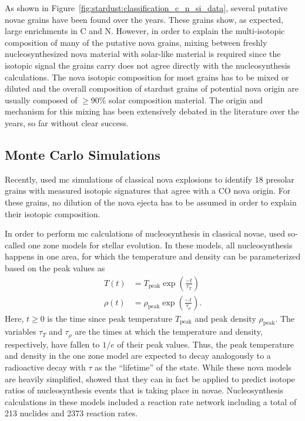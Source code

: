 As shown in Figure~\ref{fig:stardust:classification_c_n_si_data}, several putative novae grains have been found over the years. These grains show, as expected, large enrichments in C and N. However, in order to explain the multi-isotopic composition of many of the putative nova grains, mixing between freshly nucleosynthesized nova material with solar-like material is required since the isotopic signal the grains carry does not agree directly with the nucleosynthesis calculations. The nova isotopic composition for most grains has to be mixed or diluted and the overall composition of stardust grains of potential nova origin are usually composed of $\geq 90$\% solar composition material. The origin and mechanism for this mixing has been extensively debated in the literature over the years, so far without clear success.


\subsection{Monte Carlo Simulations}

Recently, \citet{iliadis18} used \ac{mc} simulations of classical nova explosions to identify 18 presolar grains with measured isotopic signatures that agree with a CO nova origin. For these grains, no dilution of the nova ejecta has to be assumed in order to explain their isotopic composition. 

In order to perform \ac{mc} calculations of nucleosynthesis in classical novae, \citet{iliadis18} used so-called one zone models for stellar evolution. In these models, all nucleosynthesis happens in one area, for which the temperature and density can be parameterized based on the peak values as
\begin{align}
    T(t) &= T_\mathrm{peak} \exp{\left(\frac{-t}{\tau_T}\right)} \\
    \rho(t) &= \rho_\mathrm{peak} \exp{\left(\frac{-t}{\tau_\rho}\right)}.
\end{align}
Here, $t \geq 0$ is the time since peak temperature $T_\mathrm{peak}$ and peak density $\rho_\mathrm{peak}$. The variables $\tau_T$ and $\tau_\rho$ are the times at which the temperature and density, respectively, have fallen to $1/e$ of their peak values. Thus, the peak temperature and density in the one zone model are expected to decay analogously to a radioactive decay with $\tau$ as the ``lifetime'' of the state. While these nova models are heavily simplified, \citet{iliadis18} showed that they can in fact be applied to predict isotope ratios of nucleosynthesis events that is taking place in novae. Nucleosynthesis calculations in these models included a reaction rate network including a total of 213 nuclides and 2373 reaction rates. 

